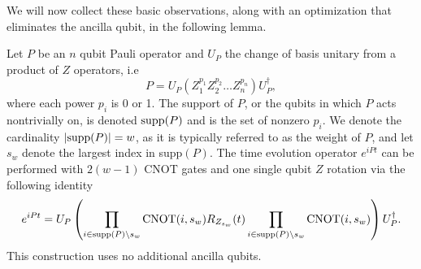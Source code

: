 We will now collect these basic observations, along with an optimization that eliminates the ancilla qubit, in the following lemma.
\begin{lemma} \label{lem:pauli_rotations}
    Let $P$ be an $n$ qubit Pauli operator and $U_P$ the change of basis unitary from a product of $Z$ operators, i.e 
    \begin{equation}
        P = U_P \left(Z_1^{p_1} Z_2^{p_2} \ldots Z_n^{p_n} \right) U_P^\dagger,
    \end{equation}
    where each power $p_i$ is 0 or 1. The support of $P$, or the qubits in which $P$ acts nontrivially on, is denoted ${\rm supp}(P)$ and is the set of nonzero $p_i$. We denote the cardinality $|{\rm supp}(P)| = w$, as it is typically referred to as the weight of $P$, and let $s_w$ denote the largest index in supp$(P)$. The time evolution operator $e^{i P t}$ can be performed with $2(w-1)$ CNOT gates and one single qubit $Z$ rotation via the following identity
    \begin{equation}
        e^{i P t} = U_P \left(\prod_{i \in {\rm supp}(P) \setminus s_w} {\rm CNOT}(i, s_w) R_{Z_{s_w}}(t) \prod_{i \in {\rm supp}(P) \setminus s_w} {\rm CNOT}(i, s_w) \right) U_P^\dagger.
    \end{equation}
    This construction uses no additional ancilla qubits.
\end{lemma}
